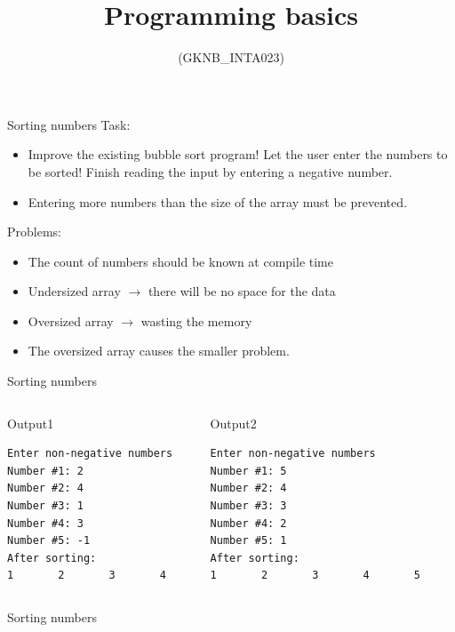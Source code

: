 \documentclass[usenames,dvipsnames,aspectratio=169]{beamer}
\title[Lecture 9.]{Programming basics}
\subtitle{(GKNB\_INTA023)}
\begin{document}
\begin{frame}[plain]
  \titlepage
\end{frame}

\begin{frame}{Sorting numbers}
  Task:
  \begin{itemize}
    \item Improve the existing bubble sort program! Let the user enter the numbers to be sorted! Finish reading the input by entering a negative number.
    \item Entering more numbers than the size of the array must be prevented.
  \end{itemize}
  Problems:
  \begin{itemize}
    \item The count of numbers should be known at compile time
    \item Undersized array $\to$ there will be no space for the data
    \item Oversized array $\to$ wasting the memory
    \item The oversized array causes the smaller problem.
  \end{itemize}
\end{frame}

\begin{frame}[fragile]{Sorting numbers}
  \begin{columns}[T]
      \begin{block}{Output1}
        \small
        \begin{verbatim}
Enter non-negative numbers
Number #1: 2
Number #2: 4
Number #3: 1
Number #4: 3
Number #5: -1
After sorting:
1       2       3       4    
\end{verbatim}
      \end{block}
      \begin{block}{Output2}
        \small
        \begin{verbatim}
Enter non-negative numbers
Number #1: 5
Number #2: 4
Number #3: 3
Number #4: 2
Number #5: 1
After sorting:
1       2       3       4       5    
\end{verbatim}
      \end{block}
  \end{columns}
\end{frame}

\begin{frame}{Sorting numbers}
  \begin{exampleblock}{}
    
    
  \end{exampleblock}
\end{frame}
\end{document}
